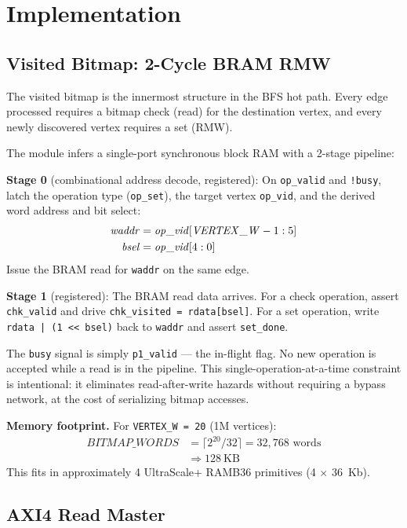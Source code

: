 \section{Implementation}
\label{sec:impl}

\subsection{Visited Bitmap: 2-Cycle BRAM RMW}

The visited bitmap is the innermost structure in the BFS hot path. Every edge
processed requires a bitmap check (read) for the destination vertex, and every
newly discovered vertex requires a set (RMW).

The module infers a single-port synchronous block RAM with a 2-stage pipeline:

\textbf{Stage 0} (combinational address decode, registered): On \texttt{op\_valid}
and \texttt{!busy}, latch the operation type (\texttt{op\_set}), the target vertex
\texttt{op\_vid}, and the derived word address and bit select:
\begin{align}
\mathit{waddr} &= \mathit{op\_vid}[\mathit{VERTEX\_W}-1 : 5] \notag \\
\mathit{bsel}  &= \mathit{op\_vid}[4:0]
\label{eq:bm_addr}
\end{align}
Issue the BRAM read for \texttt{waddr} on the same edge.

\textbf{Stage 1} (registered): The BRAM read data arrives. For a check operation,
assert \texttt{chk\_valid} and drive \texttt{chk\_visited = rdata[bsel]}.
For a set operation, write \texttt{rdata | (1 << bsel)} back to \texttt{waddr}
and assert \texttt{set\_done}.

The \texttt{busy} signal is simply \texttt{p1\_valid} — the in-flight flag.
No new operation is accepted while a read is in the pipeline. This single-operation-at-a-time
constraint is intentional: it eliminates read-after-write hazards without requiring
a bypass network, at the cost of serializing bitmap accesses.

\textbf{Memory footprint.} For \texttt{VERTEX\_W = 20} (1M vertices):
\begin{align*}
\mathit{BITMAP\_WORDS} &= \lceil 2^{20} / 32 \rceil = 32{,}768 \text{ words} \\
                        &\Rightarrow 128~\text{KB}
\end{align*}
This fits in approximately 4 UltraScale+ RAMB36 primitives (4 $\times$ 36~Kb).

\subsection{AXI4 Read Master}


